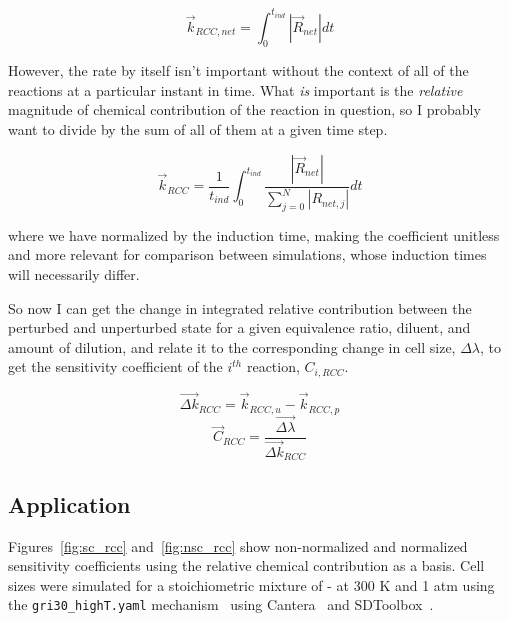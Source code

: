 \documentclass{article}
\begin{document}
\begin{equation}
    \label{eq:k_rcc_net}
    \overrightarrow{k}_{RCC, net} = \int_0^{t_{ind}} \left | \overrightarrow{R}_{net} \right | dt
\end{equation}

\noindent However, the rate by itself isn't important without the context of all of the reactions at a particular instant in time.
What \textit{is} important is the \textit{relative} magnitude of chemical contribution of the reaction in question, so I probably want to divide by the sum of all of them at a given time step.

\begin{equation}
    \label{eq:k_rcc}
    \overrightarrow{k}_{RCC} = \frac{1}{t_{ind}} \int_0^{t_{ind}} \frac{\left | \overrightarrow{R}_{net} \right |}{\sum_{j=0}^{N} \left | R_{net, j} \right |} dt
\end{equation}

\noindent where we have normalized by the induction time, making the coefficient unitless and more relevant for comparison between simulations, whose induction times will necessarily differ.

So now I can get the change in integrated relative contribution between the perturbed and unperturbed state for a given equivalence ratio, diluent, and amount of dilution, and relate it to the corresponding change in cell size, $\Delta \lambda$, to get the sensitivity coefficient of the $i^{th}$ reaction, $C_{i, RCC}$.

\begin{equation}
    \label{eq:delta_k_rcc}
\overrightarrow{\Delta k}_{RCC} = \overrightarrow{k}_{RCC, u} - \overrightarrow{k}_{RCC, p}
\end{equation}
\begin{equation}
    \label{eq:sc_rcc}
    \overrightarrow{C}_{RCC} = \frac{\overrightarrow{\Delta \lambda}}{\overrightarrow{\Delta k}_{RCC}}
\end{equation}

\subsection{Application}
\label{subsec:rcc_application}

Figures~\ref{fig:sc_rcc} and~\ref{fig:nsc_rcc} show non-normalized and normalized sensitivity coefficients using the relative chemical contribution as a basis.
Cell sizes were simulated for a stoichiometric mixture of - at 300 K and 1 atm using the \texttt{gri30\_highT.yaml} mechanism~\cite{gri3,caltech_mech_list} using Cantera~\cite{cantera} and SDToolbox~\cite{sdtoolbox}.
\end{document}
